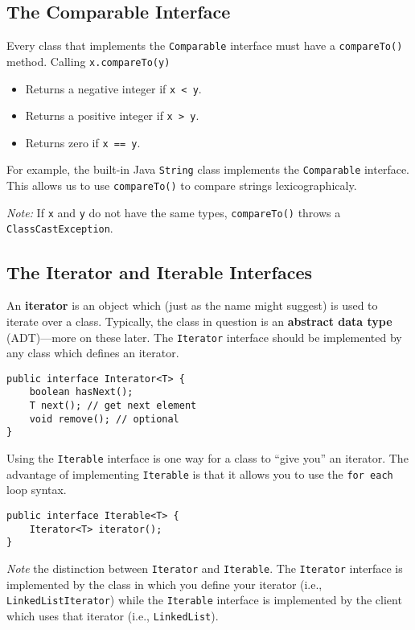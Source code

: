\documentclass{article}
\newcommand{\nline}{\vspace{\baselineskip}}
\begin{document}
\begin{flushleft}
\subsection{The Comparable Interface}

Every class that implements the \texttt{Comparable} interface must have a \texttt{compareTo()} method. Calling \texttt{x.compareTo(y)}

\begin{itemize}
    \item Returns a negative integer if \texttt{x < y}.
    \item Returns a positive integer if \texttt{x > y}.
    \item Returns zero if \texttt{x == y}.
\end{itemize}

For example, the built-in Java \texttt{String} class implements the \texttt{Comparable} interface. This allows us to use \texttt{compareTo()} to compare strings lexicographicaly.

\nline

\textit{Note:} If \texttt{x} and \texttt{y} do not have the same types, \texttt{compareTo()} throws a \texttt{ClassCastException}.

\subsection{The Iterator and Iterable Interfaces}

An \textbf{iterator} is an object which (just as the name might suggest) is used to iterate over a class. Typically, the class in question is an \textbf{abstract data type} (ADT)—more on these later. The \texttt{Iterator} interface should be implemented by any class which defines an iterator.

\begin{verbatim}
public interface Interator<T> {
    boolean hasNext();
    T next(); // get next element
    void remove(); // optional
}
\end{verbatim}

Using the \texttt{Iterable} interface is one way for a class to ``give you'' an iterator. The advantage of implementing \texttt{Iterable} is that it allows you to use the \texttt{for each} loop syntax.

\begin{verbatim}
public interface Iterable<T> {
    Iterator<T> iterator();
}
\end{verbatim}

\textit{Note} the distinction between \texttt{Iterator} and \texttt{Iterable}. The \texttt{Iterator} interface is implemented by the class in which you define your iterator (i.e., \texttt{LinkedListIterator}) while the \texttt{Iterable} interface is implemented by the client which uses that iterator (i.e., \texttt{LinkedList}).

\end{flushleft}
\end{document}

